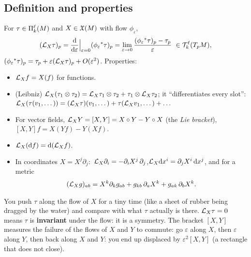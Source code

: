 \subsection{Definition and properties}
\begin{formal}
For $\tau\in\Pi^{\ell}_{k}(M)$ and $X\in\mathfrak{X}(M)$ with flow $\phi_\varepsilon$,
\[
(\Lie_X\tau)_p=\frac{\dd}{\dd\varepsilon}\Big|_{\varepsilon=0}(\phi_\varepsilon\pb\tau)_p=\lim_{\varepsilon\to0}\frac{(\phi_\varepsilon\pb\tau)_p-\tau_p}{\varepsilon}\ \in\TT{\ell}{k}(T_pM),
\]
\ie $(\phi_\varepsilon{}^{*}\tau)_p=\tau_p+\varepsilon(\mathcal{L}_X\tau)_p+O(\varepsilon^2)$. Properties:
\begin{itemize}[nosep]
\item $\mathcal{L}_Xf=X(f)$ for functions.
\item (Leibniz) $\mathcal{L}_X(\tau_1\otimes\tau_2)=\mathcal{L}_X\tau_1\otimes\tau_2+\tau_1\otimes\mathcal{L}_X\tau_2$; it ``differentiates every slot'': $\mathcal{L}_X(\tau(v_1,\dots))=(\mathcal{L}_X\tau)(v_1,\dots)+\tau(\mathcal{L}_Xv_1,\dots)+\dots$
\item For vector fields, $\mathcal{L}_XY=[X,Y]=X\circ Y-Y\circ X$ (the \emph{Lie bracket}), \ie $[X,Y]f=X(Yf)-Y(Xf)$.
\item $\mathcal{L}_X(\mathrm{d} f)=\mathrm{d}(\mathcal{L}_Xf)$.
\item In coordinates $X=X^j\partial_j$:\ $\mathcal{L}_X\partial_i=-\partial_iX^j\,\partial_j$,\quad $\mathcal{L}_X\mathrm{d} x^i=\partial_jX^i\,\mathrm{d} x^j$, and for a metric
\begin{equation}\label{eq:liemetric}
(\Lie_Xg)_{ab}=X^k\partial_kg_{ab}+g_{kb}\,\partial_aX^k+g_{ak}\,\partial_bX^k .
\end{equation}
\end{itemize}
\end{formal}

\begin{intuition}
You push $\tau$ along the flow of $X$ for a tiny time (like a sheet of rubber being dragged by the water) and compare with what $\tau$ actually is there. $\mathcal{L}_X\tau=0$ means $\tau$ is \textbf{invariant} under the flow: it is a symmetry. The bracket $[X,Y]$ measures the failure of the flows of $X$ and $Y$ to commute: go $\varepsilon$ along $X$, then $\varepsilon$ along $Y$, then back along $X$ and $Y$: you end up displaced by $\varepsilon^2[X,Y]$ (a rectangle that does not close).
\end{intuition}

